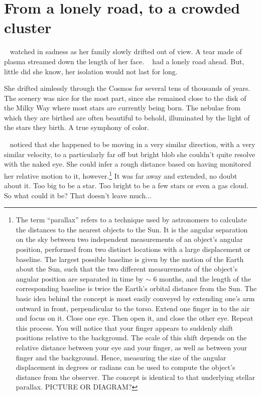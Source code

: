 \documentclass[main.tex]{subfiles}
\begin{document}
\chapter{From a lonely road, to a crowded cluster}

\newpara \nar \rmsterope~  watched in sadness as her family slowly drifted out of view.  A tear made of plasma streamed down the length of her face.  \rmsterope~ had a lonely road ahead.  But, little did she know, her isolation would not last for long.

\newpara \nar She drifted aimlessly through the Cosmos for several tens of thousands of years.  The scenery was nice for the most part, since she remained close to the disk of the Milky Way where most stars are currently being born.  The nebulae from which they are birthed are often beautiful to behold, illuminated by the light of the stars they birth.  A true symphony of color.  

\newpara \nar \rmsterope~  noticed that she happened to be moving in a very similar direction, with a very similar velocity, to a particularly far off but bright blob she couldn't quite resolve with the naked eye.  She could infer a rough distance based on having monitored her relative motion to it, however.\footnote{The term ``parallax'' refers to a technique used by astronomers to calculate the distances to the nearest objects to the Sun.  It is the angular separation on the sky between two independent measurements of an object's angular position, performed from two distinct locations with a large displacement or baseline.  The largest possible baseline is given by the motion of the Earth about the Sun, such that the two different measurements of the object's angular position are separated in time by $\sim$ 6 months, and the length of the corresponding baseline is twice the Earth's orbital distance from the Sun.  The basic idea behind the concept is most easily conveyed by extending one's arm outward in front, perpendicular to the torso.  Extend one finger in to the air and focus on it.  Close one eye.  Then open it, and close the other eye.  Repeat this process.  You will notice that your finger appears to suddenly shift positions relative to the background.  The scale of this shift depends on the relative distance between your eye and your finger, as well as between your finger and the background.  Hence, measuring the size of the angular displacement in degrees or radians can be used to compute the object's distance from the observer.  The concept is identical to that underlying stellar parallax. PICTURE OR DIAGRAM?}  It was far away and extended, no doubt about it.  Too big to be a star.  Too bright to be a few stars or even a gas cloud.  So what could it be?  That doesn't leave much...
\end{document}
